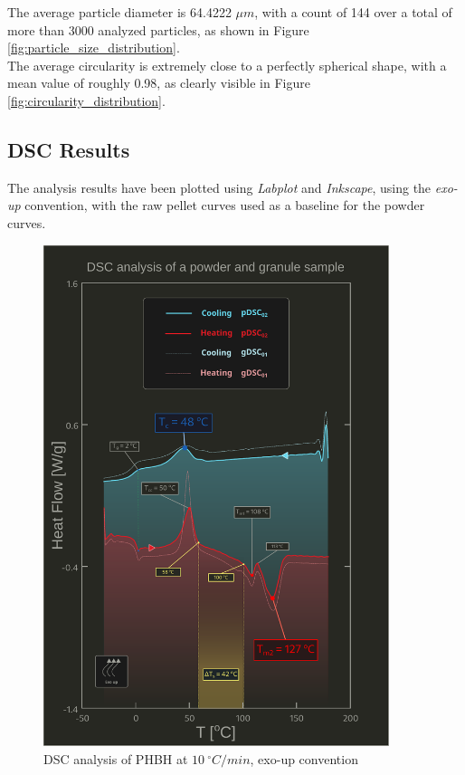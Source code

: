 \documentclass{article}
\begin{document}
      The average particle diameter is 64.4222 $\mu m$, with a count of 144 over a total of more 
      than 3000 analyzed particles, as shown in Figure \ref{fig:particle_size_distribution}. \\ 
  
      The average circularity is extremely close to a perfectly spherical shape, with a 
      mean value of roughly 0.98, as clearly visible in Figure \ref{fig:circularity_distribution}. \\ 

      \clearpage

    \subsection{DSC Results\label{DSC_results}}

    The analysis results have been plotted using \textit{Labplot} 
    and \textit{Inkscape},
    using the \textit{exo-up} convention, with the raw pellet curves used as a baseline for the powder curves. \\
        \begin{figure}[H]
            \centering 
            \includegraphics[width=0.9\textwidth]{Pictures/Thermal_analysis_plots/DSC_alberto.pdf}
            \caption{DSC analysis of PHBH at $10 \ ^{\circ}C/min$, exo-up convention}
            \label{fig:DSC_10Cmin}
        \end{figure}
\end{document}
